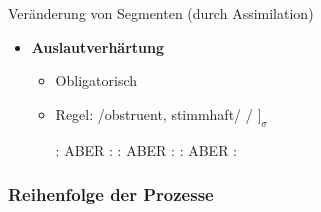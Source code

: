 \begin{frame}
{Veränderung von Segmenten (durch Assimilation)}

\begin{itemize}
	\item \textbf{Auslautverhärtung}

	\begin{itemize}
		\item Obligatorisch
		\item Regel: /obstruent, stimmhaft/  / \underline{\quad} $]_\sigma$

	\eal
		\ex {}:  \ras \textipa{[ba:t]}
		\ex ABER :  \ras \textipa{[bE:.d5]}
		\ex {}:  \ras \textipa{[Po.li:f]}
		\ex ABER :  \ras \textipa{[Po.li:.v@]}
		\ex {}:  \ras {}
		\ex ABER :  \ras \textipa{[PEn.d@]}
	\zl
	
	\end{itemize}

\end{itemize}

\end{frame}



%
\subsubsection{Reihenfolge der Prozesse}
%

